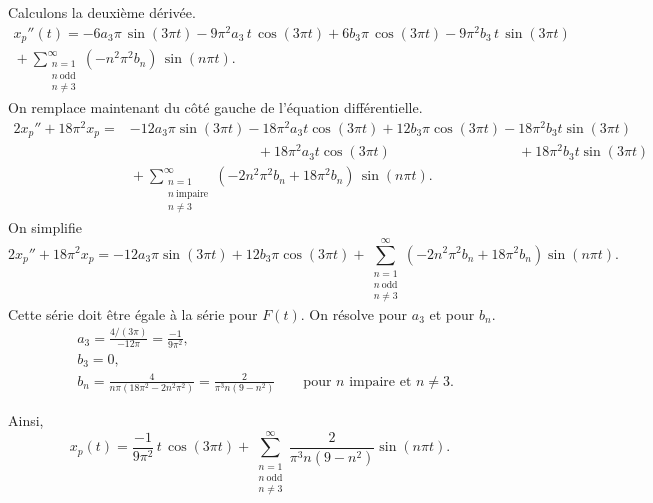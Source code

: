 \begin{example}
Calculons la deuxième dérivée.
\begin{multline*}
x_p''(t) =
- 6 a_3
\pi \, \sin (3 \pi t) - 9\pi^2 a_3 \, t \, \cos (3 \pi t)
+
6 b_3
\pi \, \cos (3 \pi t) - 9\pi^2 b_3 \, t \, \sin (3 \pi t)
\\
{} +
\sum_{\substack{n=1 \\ n~\text{odd} \\ n\not= 3}}^\infty
(-n^2 \pi^2 b_n ) \,
\sin (n \pi t) . 
\end{multline*}
On remplace maintenant du côté gauche de l'équation différentielle.
\begin{align*}
2x_p'' + 18\pi^2 x_p 
= & 
- 12 a_3 \pi \sin (3 \pi t)
- 18\pi^2 a_3 t \cos (3 \pi t)
+ 12 b_3 \pi \cos (3 \pi t)
- 18\pi^2 b_3 t \sin (3 \pi t)
\\
& \phantom{\, - 12 a_3 \pi \sin (3 \pi t)} ~
{} + 18 \pi^2 a_3 t \cos (3 \pi t)
\phantom{\, + 12 b_3 \pi \cos (3 \pi t)} ~
{} + 18 \pi^2 b_3 t \sin (3 \pi t)
\\
& {} + \sum_{\substack{n=1 \\ n~\text{impaire} \\ n\not= 3}}^\infty
(-2n^2 \pi^2 b_n + 18\pi^2 b_n) \,
\sin (n \pi t) . 
\end{align*}
On simplifie
\begin{equation*}
2x_p'' + 18\pi^2 x_p =
- 12 a_3
\pi \sin (3 \pi t)
+
12 b_3
\pi \cos (3 \pi t)
+
\sum_{\substack{n=1 \\ n~\text{odd} \\ n\not= 3}}^\infty
(-2n^2 \pi^2 b_n + 18\pi^2 b_n)
\sin (n \pi t) . 
\end{equation*}
Cette série doit être égale à la série pour $F(t)$.
On résolve pour $a_3$ et pour $b_n$.
\begin{align*}
& a_3 = \frac{4/(3\pi)}{-12\pi} = \frac{-1}{9\pi^2} , \\
& b_3 = 0 , \\
& b_n = \frac{4}{n\pi(18\pi^2 - 2n^2 \pi^2)} 
= \frac{2}{\pi^3 n(9 - n^2)} \qquad \text{pour } n \text{ impaire et } n\not=3 .
\end{align*}

Ainsi,
\begin{equation*}
x_p(t) =
\frac{-1}{9\pi^2}
\,
t \, \cos (3 \pi t)
+
\sum_{\substack{n=1 \\ n~\text{odd} \\ n\not= 3}}^\infty
\frac{2}{\pi^3 n(9 - n^2)}
\sin (n \pi t) . 
\end{equation*}
\end{example}

